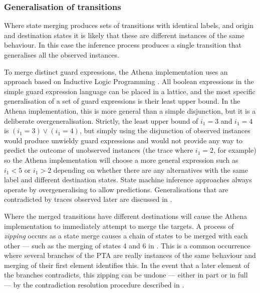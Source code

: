 \subsubsection{Generalisation of transitions}
\label{Generalisation}

Where state merging produces sets of transitions with identical labels, and origin and destination states it is likely that these are different instances of the same behaviour. In this case the inference process produces a single transition that generalises all the observed instances.

To merge distinct guard expressions, the Athena implementation uses an approach based on Inductive Logic Programming \cite{ILP}. All boolean expressions in the simple guard expression language can be placed in a lattice, and the most specific generalisation of a set of guard expressions is their least upper bound. In the Athena implementation, this is more general than a simple disjunction, but it is a deliberate overgeneralisation. Strictly, the least upper bound of $i_1 = 3$ and $i_1 = 4$ is $(i_1 = 3) \lor (i_1 = 4)$, but simply using the disjunction of observed instances would produce unwieldy guard expressions and would not provide any way to predict the outcome of unobserved instances (the trace where $i_1 = 2$, for example) so the Athena implementation will choose a more general expression such as $i_1 < 5$ or $i_1 > 2$ depending on whether there are any alternatives with the same label and different destination states. State machine inference approaches always operate by overgeneralising to allow predictions. Generalisations that are contradicted by traces observed later are discussed in .

Where the merged transitions have different destinations will cause the Athena implementation to immediately attempt to merge the targets. A process of \emph{zipping} occurs as a state merge causes a chain of states to be merged with each other --- such as the merging of states 4 and 6 in . This is a common occurrence where several branches of the PTA are really instances of the same behaviour and merging of their first element identifies this. In the event that a later element of the branches contradicts, this zipping can be undone --- either in part or in full --- by the contradiction resolution procedure described in .

